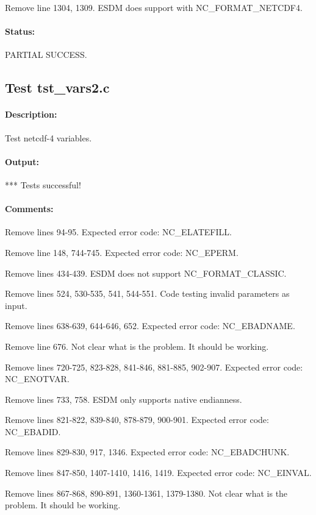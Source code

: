 Remove line 1304, 1309. ESDM does support with NC\_FORMAT\_NETCDF4.

\paragraph{Status:} PARTIAL SUCCESS.

\subsection{Test tst\_vars2.c}

\paragraph{Description:} Test netcdf-4 variables.

\paragraph{Output:} *** Tests successful!

\paragraph{Comments:}

Remove lines 94-95. Expected error code: NC\_ELATEFILL.

Remove line 148, 744-745. Expected error code: NC\_EPERM.

Remove lines 434-439. ESDM does not support NC\_FORMAT\_CLASSIC.

Remove lines 524, 530-535, 541, 544-551. Code testing invalid parameters as input.

Remove lines 638-639, 644-646, 652. Expected error code: NC\_EBADNAME.

Remove line 676. Not clear what is the problem. It should be working.

Remove lines 720-725, 823-828, 841-846, 881-885, 902-907. Expected error code: NC\_ENOTVAR.

Remove lines 733, 758. ESDM only supports native endianness.

Remove lines 821-822, 839-840, 878-879, 900-901. Expected error code: NC\_EBADID.

Remove lines 829-830, 917, 1346. Expected error code: NC\_EBADCHUNK.

Remove lines 847-850, 1407-1410, 1416, 1419. Expected error code: NC\_EINVAL.

Remove lines 867-868, 890-891, 1360-1361, 1379-1380. Not clear what is the problem. It should be working.

